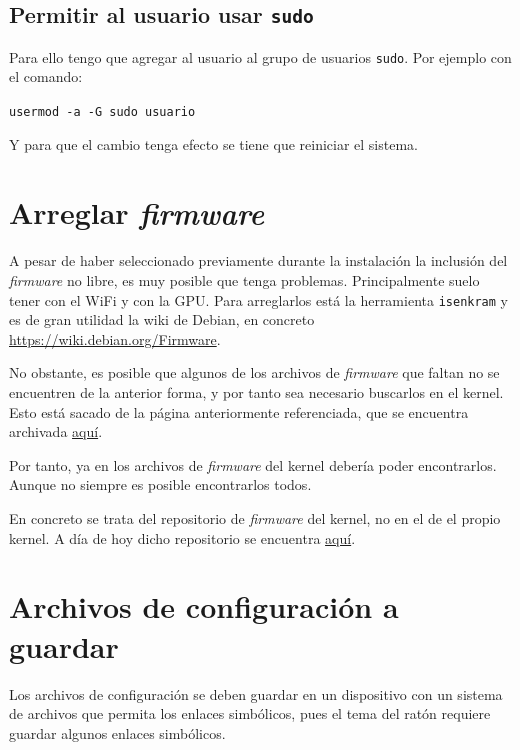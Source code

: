 \documentclass{article}
\begin{document}
    \subsection{Permitir al usuario usar \texttt{sudo}}
    Para ello tengo que agregar al usuario al grupo de usuarios
    \texttt{sudo}. Por ejemplo con el comando:

    \texttt{usermod -a -G sudo usuario}

    Y para que el cambio tenga efecto se tiene que reiniciar el sistema.

    \section{Arreglar \textit{firmware}}
    A pesar de haber seleccionado previamente durante la instalación la
    inclusión del \textit{firmware} no libre, es muy posible que tenga
    problemas. Principalmente suelo tener con el WiFi y con la GPU. Para
    arreglarlos está la herramienta \texttt{isenkram} y es de gran
    utilidad la wiki de Debian, en concreto \href{https://wiki.debian.org/Firmware}
    {https://wiki.debian.org/Firmware}.

    No obstante, es posible que algunos de los archivos de \textit{firmware}
    que faltan no se encuentren de la anterior forma, y por tanto sea
    necesario buscarlos en el kernel. Esto está sacado de la página
    anteriormente referenciada, que se encuentra archivada
    \href{https://web.archive.org/web/20260131222721/https://wiki.debian.org/Firmware}
    {aquí}.

    Por tanto, ya en los archivos de \textit{firmware} del kernel debería
    poder encontrarlos. Aunque no siempre es posible encontrarlos todos.

    En concreto se trata del repositorio de \textit{firmware} del kernel,
    no en el de el propio kernel. A día de hoy dicho repositorio se encuentra
    \href{https://git.kernel.org/pub/scm/linux/kernel/git/firmware/linux-firmware.git/tree}
    {aquí}.

    \section{Archivos de configuración a guardar}
    Los archivos de configuración se deben guardar en un dispositivo con un
    sistema de archivos que permita los enlaces simbólicos, pues el tema del
    ratón requiere guardar algunos enlaces simbólicos.
\end{document}
